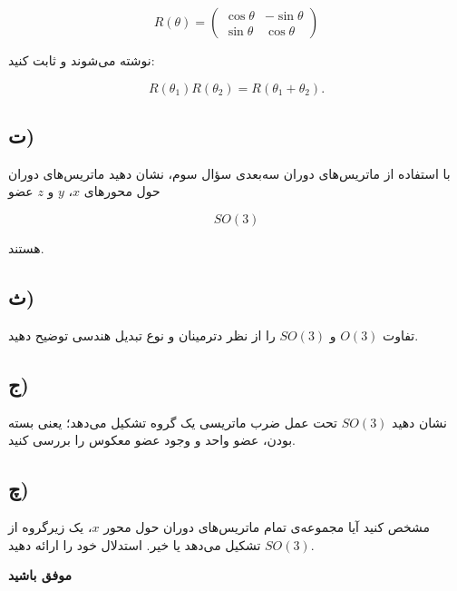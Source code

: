 \documentclass[a4paper,16pt]{article}
\begin{document}
	\[
	R(\theta)=
	\begin{pmatrix}
		\cos\theta&-\sin\theta\\
		\sin\theta&\cos\theta
	\end{pmatrix}
	\]
	
	نوشته می‌شوند و ثابت کنید:
	
	\[
	R(\theta_1)R(\theta_2)
	=
	R(\theta_1+\theta_2).
	\]
	
	\subsection*{ت)}
	
	با استفاده از ماتریس‌های دوران سه‌بعدی سؤال سوم، نشان دهید ماتریس‌های دوران حول محورهای $x$، $y$ و $z$ عضو
	
	\[
	SO(3)
	\]
	
	هستند.
	
	\subsection*{ث)}
	
	تفاوت $O(3)$ و $SO(3)$ را از نظر دترمینان و نوع تبدیل هندسی توضیح دهید.
	
	\subsection*{ج)}
	
	نشان دهید $SO(3)$ تحت عمل ضرب ماتریسی یک گروه تشکیل می‌دهد؛ یعنی بسته بودن، عضو واحد و وجود عضو معکوس را بررسی کنید.
	
	\subsection*{چ)}
	
	مشخص کنید آیا مجموعه‌ی تمام ماتریس‌های دوران حول محور $x$، یک زیرگروه از $SO(3)$ تشکیل می‌دهد یا خیر. استدلال خود را ارائه دهید.
	
	
	\vspace{20pt}
	
	\begin{center}
		\textbf{\Large موفق باشید}
	\end{center}
	
\end{document}
